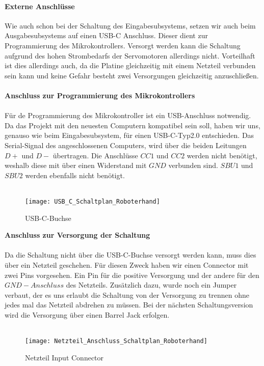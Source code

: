 \documentclass[titlepage,12pt,twoside]{article}
\begin{document}
\paragraph{Externe Anschlüsse}
\hfill \break
\hfill \break
Wie auch schon bei der Schaltung des Eingabesubsystems, setzen wir auch beim Ausgabesubsystems auf einen USB-C Anschluss.
Dieser dient zur Programmierung des Mikrokontrollers. Versorgt werden kann die Schaltung aufgrund des hohen Strombedarfs der Servomotoren
allerdings nicht. Vorteilhaft ist dies allerdings auch, da die Platine gleichzeitig mit einem Netzteil verbunden sein kann und keine 
Gefahr besteht zwei Versorgungen gleichzeitig anzuschließen. \\
\\
\textbf{Anschluss zur Programmierung des Mikrokontrollers} \\
\\
Für de Programmierung des Mikrokontroller ist ein USB-Anschluss notwendig. Da das Projekt mit den neuesten Computern
kompatibel sein soll, haben wir uns, genauso wie beim Eingabesubsystem, für einen USB-C-Typ2.0 entschieden. Das Serial-Signal
des angeschlossenen Computers, wird über die beiden Leitungen $D+$ und $D-$ übertragen. Die Anschlüsse $CC1$ und $CC2$ werden
nicht benötigt, weshalb diese mit über einen Widerstand mit $GND$ verbunden sind. $SBU1$ und $SBU2$ werden ebenfalls nicht 
benötigt. \\
\\
\begin{figure}[H]
	\begin{center}
		\scalebox{0.6}
		{\texttt{[image: USB\_C\_Schaltplan\_Roboterhand]}}
		\caption{USB-C-Buchse}
		\label{fig:USB_C_Schaltplan_Roboterhand}		
	\end{center}
\end{figure}
\hfill \break
\textbf{Anschluss zur Versorgung der Schaltung} \\
\\
Da die Schaltung nicht über die USB-C-Buchse versorgt werden kann, muss dies über ein Netzteil geschehen. Für diesen Zweck
haben wir einen Connector mit zwei Pins vorgesehen. Ein Pin für die positive Versorgung und der andere für den $GND-Anschluss$
des Netzteils.  Zusätzlich dazu, wurde noch ein Jumper verbaut, der es uns erlaubt die Schaltung von der Versorgung zu trennen
ohne jedes mal das Netzteil abdrehen zu müssen. Bei der nächsten Schaltungsversion wird die Versorgung über einen Barrel Jack
erfolgen. \\
\\
\begin{figure}[H]
	\begin{center}
		\scalebox{0.6}
		{\texttt{[image: Netzteil\_Anschluss\_Schaltplan\_Roboterhand]}}
		\caption{Netzteil Input Connector}
		\label{fig:Netzteil_Anschluss_Schaltplan_Roboterhand}		
	\end{center}
\end{figure}
\hfill \break
\newpage
\end{document}
